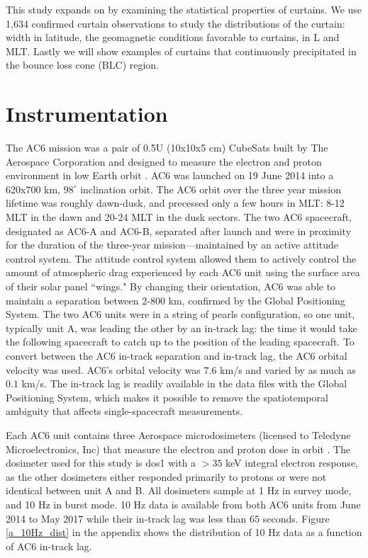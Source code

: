 \documentclass[draft]{agujournal2019}
\begin{document}
This study expands on  by examining the statistical properties of curtains. We use 1,634 confirmed curtain observations to study the distributions of the curtain: width in latitude, the geomagnetic conditions favorable to curtains,  in L and MLT. Lastly we will show examples of curtains that continuously precipitated in the bounce loss cone (BLC) region.

\section{Instrumentation} \label{instrumentation}
The AC6 mission was a pair of 0.5U (10x10x5 cm) CubeSats built by The Aerospace Corporation and designed to measure the electron and proton environment in low Earth orbit \cite{O'brien2016}. AC6 was launched on 19 June 2014 into a 620x700 km, $98^\circ$ inclination orbit. The AC6 orbit over the three year mission lifetime was roughly dawn-dusk, and precessed only a few hours in MLT: 8-12 MLT in the dawn and 20-24 MLT in the dusk sectors. The two AC6 spacecraft, designated as AC6-A and AC6-B, separated after launch and were in proximity for the duration of the three-year mission---maintained by an active attitude control system. The attitude control system allowed them to actively control the amount of atmospheric drag experienced by each AC6 unit using the surface area of their solar panel ``wings." By changing their orientation, AC6 was able to maintain a separation between 2-800 km, confirmed by the Global Positioning System. The two AC6 units were in a string of pearls configuration, so one unit, typically unit A, was leading the other by an in-track lag: the time it would take the following spacecraft to catch up to the position of the leading spacecraft. To convert between the AC6 in-track separation and in-track lag, the AC6 orbital velocity was used. AC6's orbital velocity was $7.6$ km/s and varied by as much as $0.1$ km/s. The in-track lag is readily available in the data files with the Global Positioning System, which makes it possible to remove the spatiotemporal ambiguity that affects single-spacecraft measurements.

Each AC6 unit contains three Aerospace microdosimeters (licensed to Teledyne Microelectronics, Inc) that measure the electron and proton dose in orbit \cite{O'brien2016}. The dosimeter used for this study is dos1 with a $> 35$ keV integral electron response, as the other dosimeters either responded primarily to protons or were not identical between unit A and B. All dosimeters sample at 1 Hz in survey mode, and 10 Hz in burst mode. 10 Hz data is available from both AC6 units from June 2014 to May 2017 while their in-track lag was less than 65 seconds. Figure \ref{a_10Hz_dist} in the appendix shows the distribution of 10 Hz data as a function of AC6 in-track lag.
\end{document}
